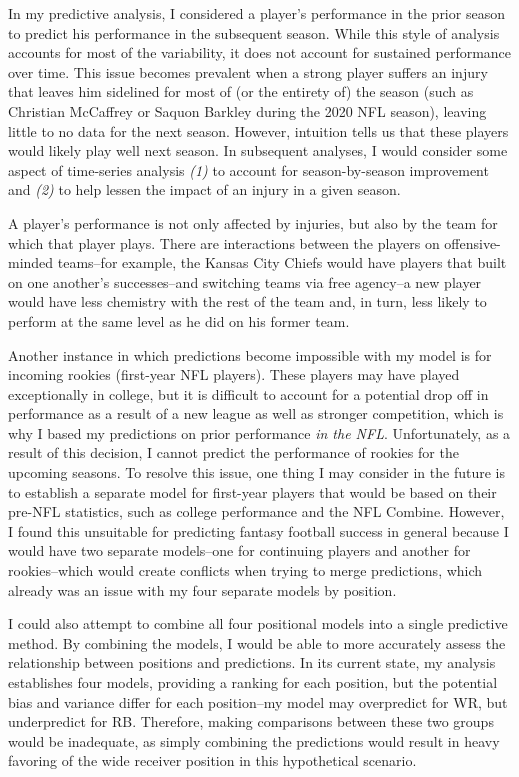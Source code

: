 \documentclass[
]{article}
\begin{document}
In my predictive analysis, I considered a player's performance in the
prior season to predict his performance in the subsequent season. While
this style of analysis accounts for most of the variability, it does not
account for sustained performance over time. This issue becomes
prevalent when a strong player suffers an injury that leaves him
sidelined for most of (or the entirety of) the season (such as Christian
McCaffrey or Saquon Barkley during the 2020 NFL season), leaving little
to no data for the next season. However, intuition tells us that these
players would likely play well next season. In subsequent analyses, I
would consider some aspect of time-series analysis \emph{(1)} to account
for season-by-season improvement and \emph{(2)} to help lessen the
impact of an injury in a given season.

A player's performance is not only affected by injuries, but also by the
team for which that player plays. There are interactions between the
players on offensive-minded teams--for example, the Kansas City Chiefs
would have players that built on one another's successes--and switching
teams via free agency--a new player would have less chemistry with the
rest of the team and, in turn, less likely to perform at the same level
as he did on his former team.

Another instance in which predictions become impossible with my model is
for incoming rookies (first-year NFL players). These players may have
played exceptionally in college, but it is difficult to account for a
potential drop off in performance as a result of a new league as well as
stronger competition, which is why I based my predictions on prior
performance \emph{in the NFL}. Unfortunately, as a result of this
decision, I cannot predict the performance of rookies for the upcoming
seasons. To resolve this issue, one thing I may consider in the future
is to establish a separate model for first-year players that would be
based on their pre-NFL statistics, such as college performance and the
NFL Combine. However, I found this unsuitable for predicting fantasy
football success in general because I would have two separate
models--one for continuing players and another for rookies--which would
create conflicts when trying to merge predictions, which already was an
issue with my four separate models by position.

I could also attempt to combine all four positional models into a single
predictive method. By combining the models, I would be able to more
accurately assess the relationship between positions and predictions. In
its current state, my analysis establishes four models, providing a
ranking for each position, but the potential bias and variance differ
for each position--my model may overpredict for WR, but underpredict for
RB. Therefore, making comparisons between these two groups would be
inadequate, as simply combining the predictions would result in heavy
favoring of the wide receiver position in this hypothetical scenario.
\end{document}
